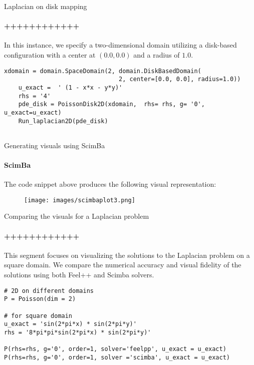 \documentclass{beamer}
\begin{document}
\begin{frame}[fragile]{Laplacian on disk mapping}
\framesubtitle{++++++++++++}

 In this instance, we specify a two-dimensional domain utilizing a disk-based configuration with a center at $(0.0, 0.0)$ and a radius of $1.0$.

\begin{lstlisting}
xdomain = domain.SpaceDomain(2, domain.DiskBasedDomain(
                                2, center=[0.0, 0.0], radius=1.0))
    u_exact =  ' (1 - x*x - y*y)'
    rhs = '4'
    pde_disk = PoissonDisk2D(xdomain,  rhs= rhs, g= '0', u_exact=u_exact)
    Run_laplacian2D(pde_disk)
    
\end{lstlisting}
\end{frame}

\begin{frame}[fragile]{Generating visuals using ScimBa}
\framesubtitle{ScimBa}
\vspace*{-0.1cm}
The code snippet above produces the following visual representation:
\vspace*{-0.2cm}
\begin{figure}
    \centering
    \texttt{[image: images/scimbaplot3.png]} 
    \label{scimba_plot}
\end{figure}
\end{frame}




\begin{frame}[fragile]{Comparing the visuals for a Laplacian problem}
\framesubtitle{++++++++++++}

 This segment focuses on visualizing the solutions to the Laplacian problem on a square domain. We compare the numerical accuracy and visual fidelity of the solutions using both Feel++ and Scimba solvers.

\begin{lstlisting}
# 2D on different domains
P = Poisson(dim = 2)

# for square domain
u_exact = 'sin(2*pi*x) * sin(2*pi*y)'
rhs = '8*pi*pi*sin(2*pi*x) * sin(2*pi*y)'

P(rhs=rhs, g='0', order=1, solver='feelpp', u_exact = u_exact)
P(rhs=rhs, g='0', order=1, solver ='scimba', u_exact = u_exact)
    
\end{lstlisting}

\end{frame}
\end{document}
